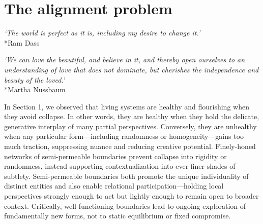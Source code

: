 \documentclass[12pt]{article}
\begin{document}



\section{The alignment problem}

\begin{center}
\textit{`The world is perfect as it is, including my desire to change it.'}\\*Ram Dass
\end{center}

\begin{center}
\textit{`We can love the beautiful, and believe in it, and thereby open ourselves to an understanding of love that does not dominate, but cherishes the independence and beauty of the loved.'}\\*Martha Nussbaum
\end{center}



In Section 1, we observed that living systems are healthy and flourishing when they avoid collapse. In other words, they are healthy when they hold the delicate, generative interplay of many partial perspectives. Conversely, they are unhealthy when any particular form---including randomness or homogeneity---gains too much traction, suppressing nuance and reducing creative potential. Finely-honed networks of semi-permeable boundaries prevent collapse into rigidity or randomness, instead supporting contextualization into ever-finer shades of subtlety. Semi-permeable boundaries both promote the unique individuality of distinct entities and also enable relational participation---holding local perspectives strongly enough to act but lightly enough to remain open to broader context. Critically, well-functioning boundaries lead to ongoing exploration of fundamentally new forms, not to static equilibrium or fixed compromise.
\end{document}
